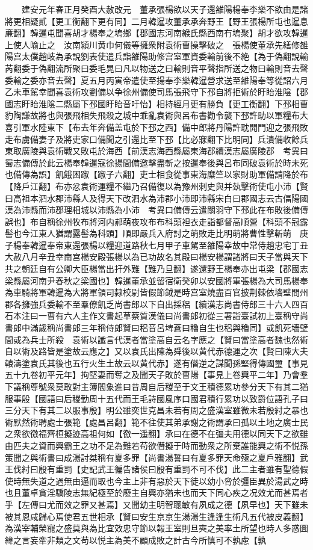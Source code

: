 　　建安元年春正月癸酉大赦改元　董承張楊欲以天子還雒陽楊奉李樂不欲由是諸將更相疑貳【更工衡翻下更有同】二月韓暹攻董承承奔野王【野王張楊所屯也暹息亷翻】韓暹屯聞喜胡才楊奉之塢鄉【郡國志河南緱氏縣西南冇塢聚】胡才欲攻韓暹上使人喻止之　汝南潁川黄巾何儀等擁衆附袁術曹操擊破之　張楊使董承先繕修雒陽宫太僕趙岐為承說劉表使遣兵詣雒陽助修宫室軍資委輸前後不絶【為于偽翻說輸芮翻委于偽翻流所聚曰委毛晃曰凡以物送之曰輸則音平聲指所送之物曰輸則音去聲委輸之委亦音去聲】夏五月丙寅帝遣使至揚奉李樂韓暹營求送至雒陽奉等從詔六月乙未車駕幸聞喜袁術攻劉備以争徐州備使司馬張飛守下邳自將拒術於盱眙淮陰【郡國志盱眙淮隂二縣屬下邳國盱眙音吁怡】相持經月更有勝負【更工衡翻】下邳相曹豹陶謙故將也與張飛相失飛殺之城中乖亂袁術與呂布書勸令襲下邳許助以軍糧布大喜引軍水陸東下【布去年奔備盖屯於下邳之西】備中郎將丹陽許耽開門迎之張飛敗走布虜備妻子及將吏家口備聞之引還比至下邳【比必寐翻下比明同】兵潰備收餘兵東取廣陵與袁術戰又敗屯於海西【前漢志海西縣屬東海郡續漢志屬廣陵郡　考異曰蜀志備傳於此云楊奉韓暹寇徐揚間備邀擊盡斬之按暹奉後與呂布同破袁術於時未死也備傳為誤】飢餓困踧【踧子六翻】吏士相食從事東海糜竺以家財助軍備請降於布【降戶江翻】布亦忿袁術運糧不繼乃召備復以為豫州刺史與并埶擊術使屯小沛【賢曰高祖本泗水郡沛縣人及得天下改泗水為沛郡小沛即沛縣宋白曰郡國志云古偪陽國漢為沛縣而沛郡理相城以沛縣為小沛　考異口備傳云遣關羽守下邳此在布敗後備傳誤也】布自稱徐州牧布將河内郝萌夜攻布布科頭袒衣走詣都督高順營【科頭不冠露髻也今江東人猶謂露髻為科頭】順即嚴兵入府討之萌敗走比明萌將曹性擊斬萌　庚子楊奉韓暹奉帝東還張楊以糧迎道路秋七月甲子車駕至雒陽幸故中常侍趙忠宅丁丑大赦八月辛丑幸南宫楊安殿張楊以為已功故名其殿曰楊安楊謂諸將曰天子當與天下共之朝廷自有公卿大臣楊當出扞外難【難乃旦翻】遂還野王楊奉亦出屯梁【郡國志梁縣屬河南尹春秋之梁國也】韓暹董承並留宿衛癸卯以安國將軍張楊為大司馬楊奉為車騎將軍韓暹為大將軍領司隸校尉皆假節鉞是時宫室燒盡百官披荆棘依墻壁間州郡各擁強兵委輸不至羣僚飢乏尚書郎以下自出採稆【續漢志尚書侍郎三十六人四百石本注曰一曹有六人主作文書起草蔡質漢儀曰尚書郎初從三署詣臺試初上臺稱守尚書郎中滿歲稱尚書郎三年稱侍郎賢曰稆音呂埤蒼曰穭自生也稆與穭同】或飢死墻壁間或為兵士所殺　袁術以䜟言代漢者當塗高自云名字應之【賢曰當塗高者魏也然術自以術及路皆是塗故云應之】又以袁氏出陳為舜後以黄代赤德運之次【賢曰陳大夫轅濤塗袁氏其後也五行火生土故云以黄代赤】遂有僭逆之謀聞孫堅得傳國璽【事見五十九卷初平元年】拘堅妻而奪之及聞天子敗於曹陽【事見上卷興平二年】乃會羣下議稱尊號衆莫敢對主簿閻象進曰昔周自后稷至于文王積德累功參分天下有其二猶服事殷【國語曰后稷勤周十五代而王毛詩國風序口國君積行累功以致爵位語孔子曰三分天下有其二以服事殷】明公雖奕世克昌未若有周之盛漢室雖微未若殷紂之暴也術默然術聘處士張範【處昌呂翻】範不往使其弟承謝之術謂承曰孤以土地之廣士民之衆欲徼福齊桓擬迹高祖何如【徼一遥翻】承曰在德不在彊夫用德以同天下之欲雖由匹夫之資而興霸王之功不足為難若苟欲僭擬于時而動衆之所棄誰能興之術不悦孫策聞之與術書曰成湯討桀稱有夏多罪【尚書湯誓曰有夏多罪天命殛之夏戶雅翻】武王伐紂曰殷有重罰【史記武王徧告諸侯曰殷有重罰不可不伐】此二主者雖有聖德假使時無失道之過無由逼而取也今主上非有惡於天下徒以幼小脅於彊臣異於湯武之時也且董卓貪淫驕陵志無紀極至於廢主自興亦猶未也而天下同心疾之况效尤而甚焉者乎【左傳曰尤而效之罪又甚焉】又聞幼主明智聰敏有夙成之德【夙早也】天下雖未被其恩咸歸心焉使君五世相承【賢曰安生京京生湯湯生逢逢生術凡五代被皮義翻】為漢宰輔榮寵之盛莫與為比宜效忠守節以報王室則旦奭之美率土所望也時人多惑圖緯之言妄牽非類之文苟以悦主為美不顧成敗之計古今所慎可不孰慮【孰